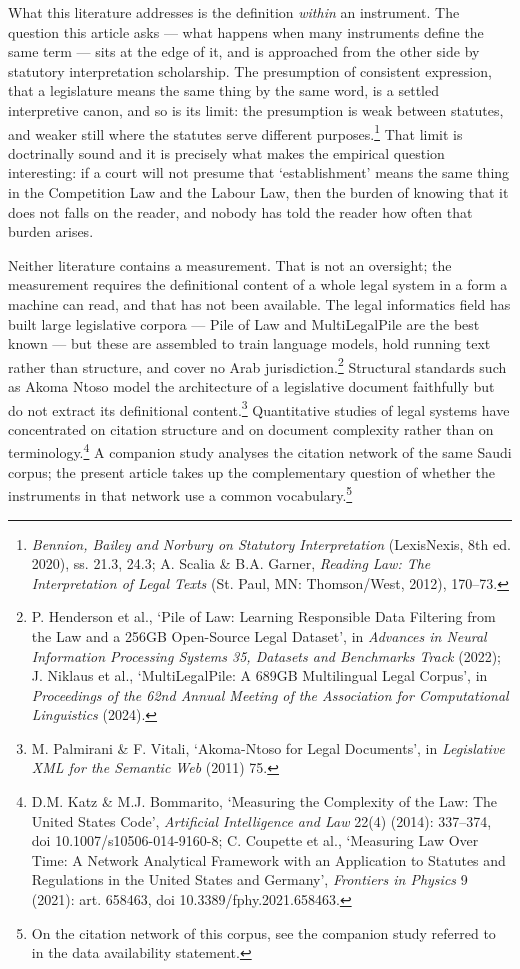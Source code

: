 \documentclass[11pt]{article}
\newif\ifanon
\begin{document}
What this literature addresses is the definition \emph{within} an
instrument. The question this article asks --- what happens when many
instruments define the same term --- sits at the edge of it, and is
approached from the other side by statutory interpretation scholarship. The
presumption of consistent expression, that a legislature means the same thing
by the same word, is a settled interpretive canon, and so is its limit: the
presumption is weak between statutes, and weaker still where the statutes
serve different purposes.\footnote{\emph{Bennion, Bailey and Norbury on Statutory Interpretation} (LexisNexis, 8th ed. 2020), ss. 21.3, 24.3; A. Scalia \& B.A. Garner, \emph{Reading Law: The Interpretation of Legal Texts} (St. Paul, MN: Thomson/West, 2012), 170--73.} That limit is
doctrinally sound and it is precisely what makes the empirical question
interesting: if a court will not presume that `establishment' means the same
thing in the Competition Law and the Labour Law, then the burden of knowing
that it does not falls on the reader, and nobody has told the reader how
often that burden arises.

Neither literature contains a measurement. That is not an oversight; the
measurement requires the definitional content of a whole legal system in a
form a machine can read, and that has not been available. The legal
informatics field has built large legislative corpora --- Pile of Law and
MultiLegalPile are the best known --- but these are assembled to train
language models, hold running text rather than structure, and cover no Arab
jurisdiction.\footnote{P. Henderson et al., `Pile of Law: Learning Responsible Data Filtering from the Law and a 256GB Open-Source Legal Dataset', in \emph{Advances in Neural Information Processing Systems 35, Datasets and Benchmarks Track} (2022); J. Niklaus et al., `MultiLegalPile: A 689GB Multilingual Legal Corpus', in \emph{Proceedings of the 62nd Annual Meeting of the Association for Computational Linguistics} (2024).} Structural standards such as Akoma Ntoso model the architecture of a
legislative document faithfully but do not extract its definitional
content.\footnote{M. Palmirani \& F. Vitali, `Akoma-Ntoso for Legal Documents', in \emph{Legislative XML for the Semantic Web} (2011) 75.} Quantitative studies of legal systems have concentrated on citation
structure and on document complexity rather than on
terminology.\footnote{D.M. Katz \& M.J. Bommarito, `Measuring the Complexity of the Law: The United States Code', \emph{Artificial Intelligence and Law} 22(4) (2014): 337--374, doi 10.1007/s10506-014-9160-8; C. Coupette et al., `Measuring Law Over Time: A Network Analytical Framework with an Application to Statutes and Regulations in the United States and Germany', \emph{Frontiers in Physics} 9 (2021): art. 658463, doi 10.3389/fphy.2021.658463.} A companion study analyses the citation network of the same Saudi
corpus; the present article takes up the complementary question of whether
the instruments in that network use a common vocabulary.\footnote{On the
citation network of this corpus, see the companion study referred to in the
data availability statement\ifanon{} supplied with this submission\fi.}
\end{document}
